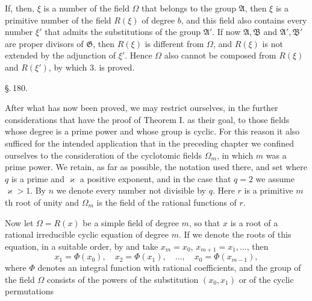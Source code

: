 
If, then, $\xi$ is a number of the field $\Omega$ that belongs to the
group $\mathfrak{A}$, then $\xi$ is a primitive number of the field
$R(\xi)$ of degree $b$, and this field also contains every number $\xi'$
that admits the substitutions of the group $\mathfrak{A}'$. If now
$\mathfrak{A}, \mathfrak{B}$ and $\mathfrak{A}', \mathfrak{B}'$ are proper divisors of $\mathfrak{G}$, then $R(\xi)$ is different from
$\Omega$, and $R(\xi)$ is not extended by the adjunction of $\xi'$.
Hence $\Omega$ also cannot be composed from $R(\xi)$ and $R(\xi')$,
by which 3. is proved.

\begin{center}
\S.\,180.

\end{center}

After what has now been proved, we may restrict ourselves, in
the further considerations that have the proof of Theorem I. as
their goal, to those  fields whose degree is a prime power
and whose group is cyclic. For this reason it also sufficed for
the intended application that in the preceding chapter we confined
ourselves to the consideration of the cyclotomic fields $\Omega_m$,
in which $m$ was a prime power. We retain, as far as possible,
the notation used there, and set
where $q$ is a prime and $\varkappa$ a positive exponent, and in the
case that $q = 2$ we assume $\varkappa > 1$. By $n$ we denote every
number not divisible by $q$. Here $r$ is a primitive $m$th root of
unity and $\Omega_m$ is the field of the rational functions of $r$.

Now let $\Omega = R(x)$ be a simple  field of degree $m$,
so that $x$ is a root of a rational irreducible cyclic equation of
degree $m$. If we denote the roots of this equation, in a suitable
order, by
and take $x_m = x_0$, $x_{m+1} = x_1, \ldots$, then
\[
x_1 = \Phi(x_0), \quad x_2 = \Phi(x_1), \quad \ldots, \quad x_0 = \Phi(x_{m-1}),
\]
where $\Phi$ denotes an integral function with rational coefficients,
and the group of the field $\Omega$ consists of the powers of the
substitution $(x_0, x_1)$ or of the cyclic permutations
